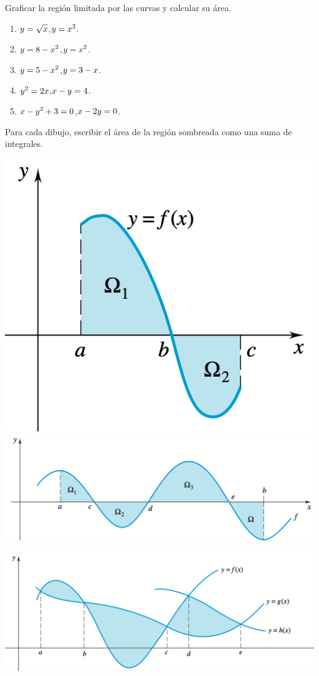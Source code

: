 \item Graficar la región limitada por las curvas y calcular su área.
\begin{multicols}{2}
  \begin{enumerate}
    \item $\displaystyle y= \sqrt x$,\quad $\displaystyle y= x^2$.
    \item $\displaystyle y= 8-x^2$,\quad $\displaystyle y= x^2 $.
    \item $\displaystyle y= 5-x^2$,\quad $\displaystyle y= 3-x $.
    \item $\displaystyle y^2=2x$,\quad $\displaystyle x-y=4  $.
    \item $\displaystyle x-y^2+3=0 $,\quad $\displaystyle x-2y=0  $.
  \end{enumerate}
  
\end{multicols}

\item Para cada dibujo, escribir el área de la región sombreada como una suma de integrales.

\begin{center}
  \includegraphics[height=.22\textwidth]{pics/areas-7a.png}
  \hfil
  \includegraphics[height=.22\textwidth]{pics/areas-7b.png}

  \includegraphics[height=.28\textwidth]{pics/areas-7c.png}
\end{center}
